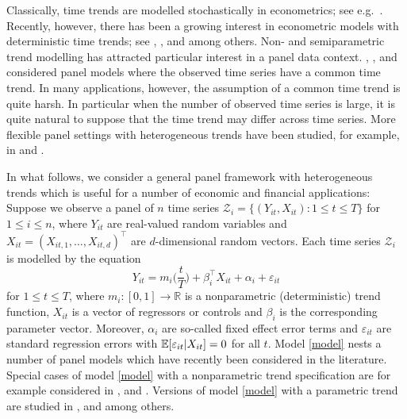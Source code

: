 \documentclass[a4paper,12pt]{article}
\begin{document}
Classically, time trends are modelled stochastically in econometrics; see e.g.\ \cite{Stock1988}. Recently, however, there has been a growing interest in econometric models with deterministic time trends; see \cite{Cai2007}, \cite{Atak2011}, \cite{Robinson2012} and \cite{ChenGaoLi2012} among others. Non- and semiparametric trend modelling has attracted particular interest in a panel data context. \cite{LiChenGao2010}, \cite{Atak2011}, \cite{Robinson2012} and \cite{ChenGaoLi2012} considered panel models where the observed time series have a common time trend. In many applications, however, the assumption of a common time trend is quite harsh. In particular when the number of observed time series is large, it is quite natural to suppose that the time trend may differ across time series. More flexible panel settings with heterogeneous trends have been studied, for example, in \cite{Zhang2012} and \cite{Hidalgo2014}. 

 
In what follows, we consider a general panel framework with heterogeneous trends which is useful for a number of economic and financial applications: Suppose we observe a panel of $n$ time series $\mathcal{Z}_i = \{ (Y_{it},X_{it}): 1 \le t \le T \}$ for $1 \le i \le n$, where $Y_{it}$ are real-valued random variables and $X_{it} = (X_{it,1},\ldots,X_{it,d})^\top$ are $d$-dimensional random vectors. Each time series $\mathcal{Z}_i$ is modelled by the equation
\begin{equation}\label{model}
Y_{it} = m_i \Big( \frac{t}{T} \Big) + \beta_i^\top X_{it} + \alpha_i + \varepsilon_{it}
\end{equation}
for $1 \le t \le T$, where $m_i: [0,1] \rightarrow \mathbb{R}$ is a nonparametric (deterministic) trend function, $X_{it}$ is a vector of regressors or controls and $\beta_i$ is the corresponding parameter vector. Moreover, $\alpha_i$ are so-called fixed effect error terms and $\varepsilon_{it}$ are standard regression errors with $\mathbb{E}[\varepsilon_{it}|X_{it}] = 0$ for all $t$. Model \eqref{model} nests a number of panel models which have recently been considered in the literature. Special cases of model \eqref{model} with a nonparametric trend specification are for example considered in \cite{Atak2011}, \cite{Zhang2012} and \cite{Hidalgo2014}. Versions of model \eqref{model} with a parametric trend are studied in \cite{Vogelsang2005}, \cite{Sun2011} and \cite{Xu2012} among others.
\end{document}
